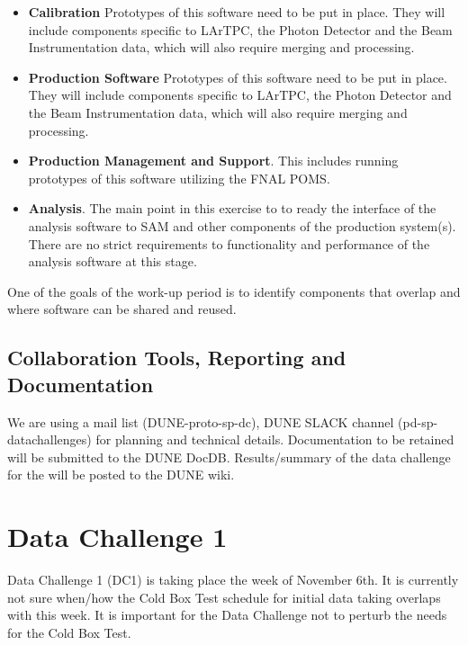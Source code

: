 \documentclass[pdftex,12pt,letter]{article}
\begin{document}
\begin{itemize}
\item  \textbf{Calibration}
Prototypes of this software need to be put in place. They will
include components specific to LArTPC, the Photon Detector and the Beam Instrumentation data, which will also require
merging and processing.
\item \textbf{Production Software} Prototypes of this software need to be put in place. They will
include components specific to LArTPC, the Photon Detector and the Beam Instrumentation data, which will also require
merging and processing.

\item  \textbf{Production Management and Support}. This includes running prototypes of this software utilizing the FNAL POMS.

\item  \textbf{Analysis}. The main point in this exercise to to ready the interface of the analysis software to SAM and other
components of the production system(s). There are no strict requirements to functionality and performance of the analysis
software at this stage.

\end{itemize}
\noindent  One of the goals of the work-up period is to identify components that overlap and where software can be shared and reused. 

\subsection{Collaboration Tools, Reporting and Documentation}
We are using a mail list (DUNE-proto-sp-dc), DUNE SLACK channel (pd-sp-datachallenges) for planning and technical details.  Documentation to be retained will be submitted to the DUNE DocDB. Results/summary of the data challenge for the will be posted to the DUNE wiki.

\clearpage

\section{Data Challenge 1}

Data Challenge 1 (DC1) is taking place the week of November 6th. It is currently not sure when/how the Cold Box Test schedule for initial data taking overlaps with this week.  It is important for the Data Challenge not to perturb the needs for the Cold Box Test. 
\end{document}
